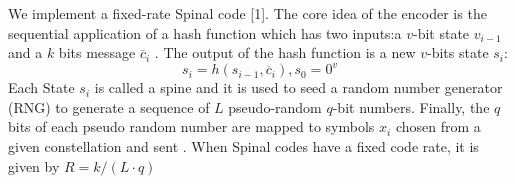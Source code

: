 \documentclass[a4paper]{article}
\begin{document}
We implement a fixed-rate Spinal code [1]. The core idea of the encoder is the sequential application of a hash
function which has two inputs:a $v$-bit state $v_{i-1}$ and a $k$ bits message $\overline{c}_i$
. The output of the hash function is a
new $v$-bits state $s_i$:
\begin{equation}
s_i=h(s_{i-1},\overline{c}_i),s_0=0^v
\end{equation}
Each State $s_i$ is called a spine and it is used to seed a random number generator (RNG) to generate a sequence of
$L$ pseudo-random $q$-bit numbers. Finally, the $q$ bits of each pseudo random number are mapped to symbols $x_i$ chosen from a given constellation and sent
. When Spinal codes have a fixed code rate, it is given by $R=k/(L\cdot q)$
\end{document}
